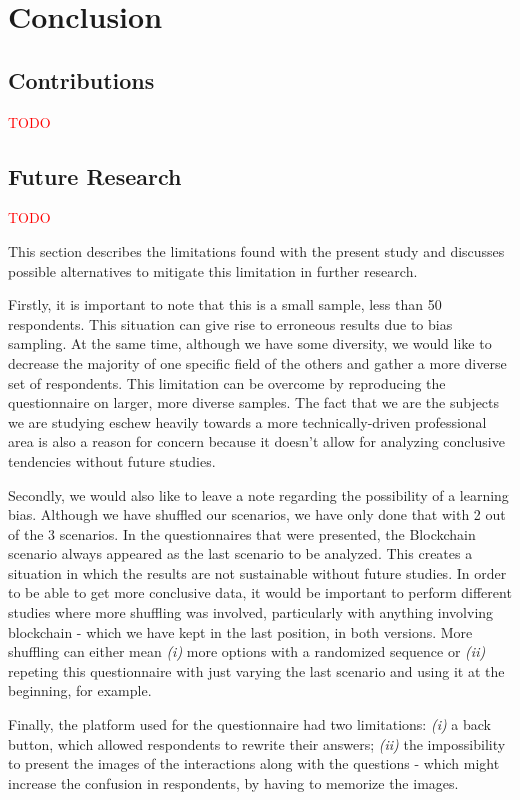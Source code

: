 \chapter{Conclusion}
\label{chap:conclusion}

\section{Contributions}
\textcolor{red}{TODO}

\section{Future Research}
\textcolor{red}{TODO}

This section describes the limitations found with the present study and discusses possible alternatives to mitigate this limitation in further research.

Firstly, it is important to note that this is a small sample, less than 50 respondents. This situation can give rise to erroneous results due to bias sampling. At the same time, although we have some diversity, we would like to decrease the majority of one specific field of the others and gather a more diverse set of respondents. This limitation can be overcome by reproducing the questionnaire on larger, more diverse samples. The fact that we are the subjects we are studying eschew heavily towards a more technically-driven professional area is also a reason for concern because it doesn't allow for analyzing conclusive tendencies without future studies.

Secondly, we would also like to leave a note regarding the possibility of a learning bias. Although we have shuffled our scenarios, we have only done that with 2 out of the 3 scenarios. In the questionnaires that were presented, the Blockchain scenario always appeared as the last scenario to be analyzed. This creates a situation in which the results are not sustainable without future studies. In order to be able to get more conclusive data, it would be important to perform different studies where more shuffling was involved, particularly with anything involving blockchain - which we have kept in the last position, in both versions. More shuffling can either mean \textit{(i)} more options with a randomized sequence or \textit{(ii)} repeting this questionnaire with just varying the last scenario and using it at the beginning, for example.

Finally, the platform used for the questionnaire had two limitations: \textit{(i)} a back button, which allowed respondents to rewrite their answers; \textit{(ii)} the impossibility to present the images of the interactions along with the questions - which might increase the confusion in respondents, by having to memorize the images.
